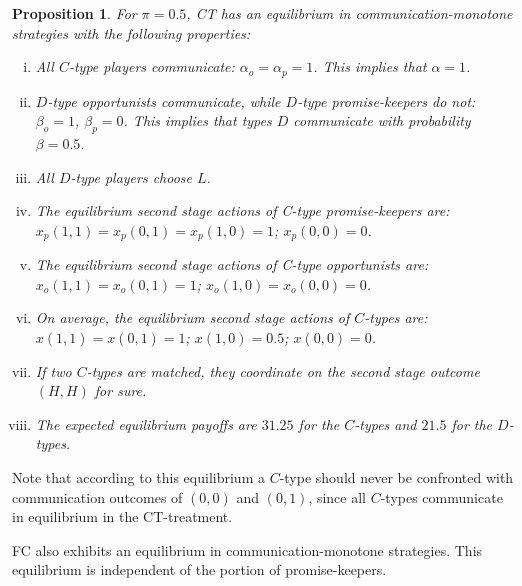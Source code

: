 \documentclass[12pt]{article}
\newtheorem{proposition}{Proposition} \theoremstyle{definition}
\theoremstyle{break}
\begin{document}
\begin{proposition}\label{prop:CT}
	For $\pi =0.5$, CT has an equilibrium in communication-monotone strategies with the following properties: 
	\begin{enumerate}[i)]\setlength\itemsep{0em}
		\item All $C$-type players communicate: $\alpha_o=\alpha_p=1$. This implies that $\alpha=1$.
		\item $D$-type opportunists communicate, while $D$-type promise-keepers do not: $\beta_o=1$, $\beta_p=0$. This implies that types $D$ communicate with probability $\beta=0.5$.
		\item All $D$-type players choose $L$.
		\item The equilibrium second stage actions of C-type promise-keepers are:  $x_p(1,1)=x_p(0,1)=x_p(1,0)=1$; $x_p(0,0)=0$.
		\item The equilibrium second stage actions of C-type opportunists are: $x_o(1,1)=x_o(0,1)=1$; $x_o(1,0)=x_o(0,0)=0$.
		\item On average, the equilibrium second stage actions of $C$-types are: $x(1,1)=x(0,1)=1$; $x(1,0)=0.5$; $x(0,0)=0$.
		\item If two $C$-types are matched, they coordinate on the second stage outcome $(H,H)$ for sure.
		\item The expected equilibrium payoffs are $31.25$ for the $C$-types and $21.5$ for the $D$-types.
	\end{enumerate} 
\end{proposition} 

Note that according to this equilibrium a $C$-type should never be confronted with communication outcomes of $(0,0)$ and $(0,1)$, since all $C$-types communicate in equilibrium in the CT-treatment.

FC also exhibits an equilibrium in communication-monotone strategies. This equilibrium is independent of the portion of promise-keepers.
\end{document}
